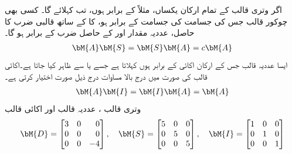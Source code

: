 اگر وتری قالب  کے تمام ارکان یکساں، مثلاً  کے برابر ہوں، تب   کہلائے گا۔ کسی بھی چوکور قالب  جس کی جسامت  کی جسامت کے برابر ہو، کا  کے ساتھ قالبی ضرب کا حاصل، عددیہ مقدار  اور  کے حاصل ضرب کے برابر ہو گا۔ 
\begin{align}
\bM{A}\bM{S}=\bM{S}\bM{A}=c\bM{A}
\end{align}
ایسا عددیہ قالب جس کے ارکان اکائی  کے برابر ہوں  کہلاتا ہے جسے  یا  سے ظاہر کیا جاتا ہے۔اکائی قالب کی صورت میں درج بالا مساوات درج ذیل صورت اختیار کرتی ہے۔
\begin{align}
\bM{A}\bM{I}=\bM{I}\bM{A}=\bM{A}
\end{align}
\quad وتری قالب ، عددیہ قالب  اور اکائی قالب  \\
\begin{align*}
\bM{D}=\begin{bmatrix*}[r] 3&0&0\\0&0&0\\0&0&-4 \end{bmatrix*}, \quad \bM{S}=\begin{bmatrix*}[r] 5&0&0\\0&5&0\\0&0&5 \end{bmatrix*},\quad \bM{I}=\begin{bmatrix*}[r] 1&0&0\\0&1&0\\0&0&1\end{bmatrix*}
\end{align*}

